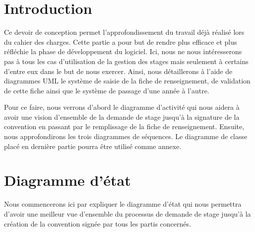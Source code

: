 \documentclass{scrreprt}
\begin{document}
\tableofcontents

\chapter{Introduction}

Ce devoir de conception permet l'approfondissement du travail déjà réalisé lors du 
cahier des charges. Cette partie a pour but de rendre plus efficace et plus réfléchie la phase 
de développement du logiciel. Ici, nous ne nous intéresserons pas à tous les cas d'utilisation 
de la gestion des stages mais seulement à certains d'entre eux dans le but de nous exercer. Ainsi, 
nous détaillerons à l'aide de diagrammes UML le système de saisie de la fiche de renseignement, de  
validation de cette fiche ainsi que le système de passage d'une année à l'autre.  

	Pour ce faire, nous verrons d'abord le diagramme d'activité qui nous aidera à avoir une vision 
d'ensemble de la demande de stage jusqu'à la signature de la convention en passant par le remplissage
de la fiche de renseignement. Ensuite, nous approfondirons les trois diagrammes de séquences. Le diagramme
de classe placé en dernière partie pourra être utilisé comme annexe. 

\newpage
\chapter{Diagramme d'état}

	Nous commencerons ici par expliquer le diagramme d'état qui nous permettra d'avoir une meilleur vue d'ensemble
du processus de demande de stage jusqu'à la création de la convention signée par tous les partis concernés. 
\end{document}
